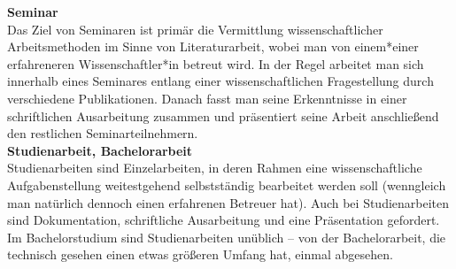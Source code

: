 {\textbf{Seminar}\\

Das Ziel von Seminaren ist primär die Vermittlung wissenschaftlicher Arbeitsmethoden im Sinne von Literaturarbeit, wobei man von einem*einer erfahreneren Wissenschaftler*in betreut wird. In der Regel arbeitet man sich innerhalb eines Seminares entlang einer wissenschaftlichen Fragestellung durch verschiedene Publikationen. Danach fasst man seine Erkenntnisse in einer schriftlichen Ausarbeitung zusammen und präsentiert seine Arbeit anschließend den restlichen Seminarteilnehmern.\\

\textbf{Studienarbeit, Bachelorarbeit}\\

Studienarbeiten sind Einzelarbeiten, in deren Rahmen eine wissenschaftliche Aufgabenstellung weitestgehend selbstständig bearbeitet werden soll (wenngleich man natürlich dennoch einen erfahrenen Betreuer hat). Auch bei Studienarbeiten sind Dokumentation, schriftliche Ausarbeitung und eine Präsentation gefordert. Im Bachelorstudium sind Studienarbeiten unüblich – von der Bachelorarbeit, die technisch gesehen einen etwas größeren Umfang hat, einmal abgesehen.
}{}
